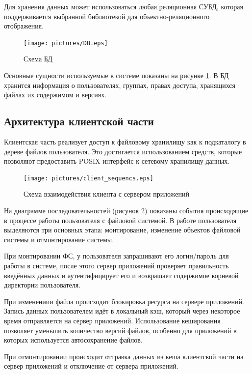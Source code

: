 \documentclass[utf8,usehyperref,12pt]{G7-32}
\begin{document}
Для хранения данных может использоваться любая реляционная СУБД, которая поддерживается выбранной библиотекой для объектно-реляционного отображения.

\begin{figure}[ht]
   \centering%
   \texttt{[image: pictures/DB.eps]}
   \caption{Схема БД}\label{fig:db_scheme}
 \end{figure}

Основные сущности используемые в системе показаны на рисунке \ref{fig:db_scheme}. В БД хранится информация о пользователях, группах, правах доступа, хранящихся файлах их содержимом и версиях.
 
\subsection{Архитектура клиентской части}

Клиентская часть реализует доступ к файловому хранилищу как к подкаталогу в дереве файлов пользователя. Это достигается использованием средств, которые позволяют предоставить POSIX интерфейс к сетевому хранилищу данных.

\begin{figure}[ht]
   \centering%
   \texttt{[image: pictures/client\_sequencs.eps]}
   \caption{Схема взаимодействия клиента с сервером приложений}\label{fig:client_sequence}
 \end{figure}

На диаграмме последовательностей (рисунок \ref{fig:client_sequence}) показаны события происходящие в процессе работы пользователя с файловой системой. В работе пользователя выделяются три основных этапа: монтирование, изменение объектов файловой системы и отмонтирование системы. 

При монтировании ФС, у пользователя запрашивают его логин/пароль для работы в системе, после этого сервер приложений проверяет правильность введённых данных и аутентифицирует его и возвращает содержимое корневой директории пользователя.

При изменениии файла происходит блокировка ресурса на сервере приложений. Запись данных пользователем идёт в локальный кэш, который через некоторое время отправляется на сервер приложений. Использование кеширования позволяет уменьшить количество версий файлов, особенно для приложений в которых используется автосохранение файлов.

При отмонтировании происходит оттравка данных из кеша клиентской части на сервер приложений и отключение от сервера приложений.
\end{document}

